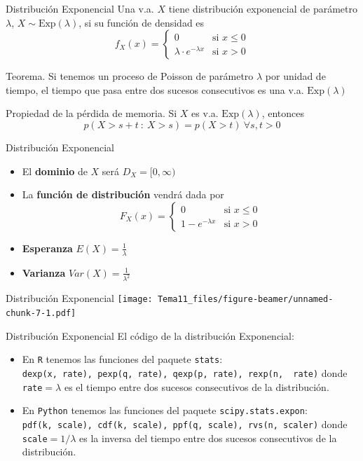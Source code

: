 \documentclass[
  ignorenonframetext,
]{beamer}
\providecommand{\tightlist}{%
  \setlength{\itemsep}{0pt}\setlength{\parskip}{0pt}}
\begin{document}
\begin{frame}{Distribución Exponencial}
\protect\hypertarget{distribuciuxf3n-exponencial}{}
Una v.a. \(X\) tiene distribución exponencial de parámetro \(\lambda\),
\(X\sim\text{Exp}(\lambda)\), si su función de densidad es
\[f_X(x)=\left\{
\begin{array}{rl}
     0 & \text{si }  x\le 0
  \\ \lambda\cdot e^{-\lambda x} & \text{si }x>0
\end{array}
\right.\]

Teorema. Si tenemos un proceso de Poisson de parámetro \(\lambda\) por
unidad de tiempo, el tiempo que pasa entre dos sucesos consecutivos es
una v.a. \(\text{Exp}(\lambda)\)

Propiedad de la pérdida de memoria. Si \(X\) es v.a.
\(\text{Exp}(\lambda)\), entonces
\[p(X>s+t\ :\ X>s)=p(X>t)\ \forall s,t>0\]
\end{frame}

\begin{frame}{Distribución Exponencial}
\protect\hypertarget{distribuciuxf3n-exponencial-1}{}
\begin{itemize}
\item
  El \textbf{dominio} de \(X\) será \(D_X = [0,\infty)\)
\item
  La \textbf{función de distribución} vendrá dada por \[F_X(x)=\left\{
  \begin{array}{rl}
    0 & \text{si } x\le 0
  \\ 1-e^{-\lambda x} & \text{si } x>0
  \end{array}
  \right.\]
\item
  \textbf{Esperanza} \(E(X) = \frac{1}{\lambda}\)
\item
  \textbf{Varianza} \(Var(X) = \frac{1}{\lambda^2}\)
\end{itemize}
\end{frame}

\begin{frame}{Distribución Exponencial}
\protect\hypertarget{distribuciuxf3n-exponencial-2}{}
\texttt{[image: Tema11\_files/figure-beamer/unnamed-chunk-7-1.pdf]}
\end{frame}

\begin{frame}[fragile]{Distribución Exponencial}
\protect\hypertarget{distribuciuxf3n-exponencial-3}{}
El código de la distribución Exponencial:

\begin{itemize}
\tightlist
\item
  En \texttt{R} tenemos las funciones del paquete \texttt{stats}:
  \texttt{dexp(x,\ rate),\ pexp(q,\ rate),\ qexp(p,\ rate),\ rexp(n,\ \ rate)}
  donde \texttt{rate}\(=\lambda\) es el tiempo entre dos sucesos
  consecutivos de la distribución.
\item
  En \texttt{Python} tenemos las funciones del paquete
  \texttt{scipy.stats.expon}:
  \texttt{pdf(k,\ scale),\ cdf(k,\ scale),\ ppf(q,\ scale),\ rvs(n,\ scaler)}
  donde \texttt{scale}\(=1/\lambda\) es la inversa del tiempo entre dos
  sucesos consecutivos de la distribución.
\end{itemize}
\end{frame}
\end{document}

